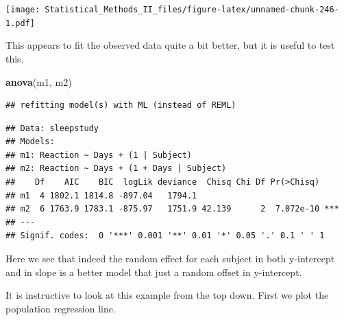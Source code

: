 \documentclass[]{book}
\newenvironment{Shaded}{\begin{snugshade}}{\end{snugshade}}
\newcommand{\KeywordTok}[1]{\textcolor[rgb]{0.13,0.29,0.53}{\textbf{{#1}}}}
\newcommand{\DataTypeTok}[1]{\textcolor[rgb]{0.13,0.29,0.53}{{#1}}}
\newcommand{\DecValTok}[1]{\textcolor[rgb]{0.00,0.00,0.81}{{#1}}}
\newcommand{\StringTok}[1]{\textcolor[rgb]{0.31,0.60,0.02}{{#1}}}
\newcommand{\NormalTok}[1]{{#1}}
\theoremstyle{definition}
\theoremstyle{definition}
\theoremstyle{remark}
\begin{document}
\texttt{[image: Statistical\_Methods\_II\_files/figure-latex/unnamed-chunk-246-1.pdf]}

This appears to fit the observed data quite a bit better, but it is
useful to test this.

\begin{Shaded}
\begin{Highlighting}[]
\KeywordTok{anova}\NormalTok{(m1, m2)}
\end{Highlighting}
\end{Shaded}

\begin{verbatim}
## refitting model(s) with ML (instead of REML)
\end{verbatim}

\begin{verbatim}
## Data: sleepstudy
## Models:
## m1: Reaction ~ Days + (1 | Subject)
## m2: Reaction ~ Days + (1 + Days | Subject)
##    Df    AIC    BIC  logLik deviance  Chisq Chi Df Pr(>Chisq)    
## m1  4 1802.1 1814.8 -897.04   1794.1                             
## m2  6 1763.9 1783.1 -875.97   1751.9 42.139      2  7.072e-10 ***
## ---
## Signif. codes:  0 '***' 0.001 '**' 0.01 '*' 0.05 '.' 0.1 ' ' 1
\end{verbatim}

Here we see that indeed the random effect for each subject in both
y-intercept and in slope is a better model that just a random offset in
y-intercept.

It is instructive to look at this example from the top down. First we
plot the population regression line.

\begin{Shaded}
\end{Shaded}
\end{document}
